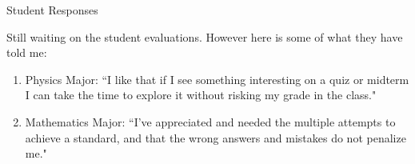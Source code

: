 \documentclass{beamer}
\begin{document}
\begin{frame}{Student Responses}

Still waiting on the student evaluations.  However here is some of what they have told me:

\begin{enumerate}

\item Physics Major:  ``I like that if I see something interesting on a quiz or midterm I can take the time to explore it without risking my grade in the class."

\item Mathematics Major: ``I've appreciated and needed the multiple attempts to achieve a standard, and that the wrong answers and mistakes do not penalize me."

\end{enumerate}

\end{frame}
\end{document}
